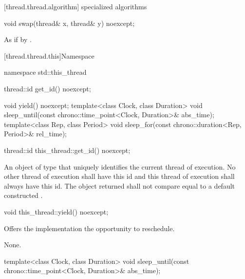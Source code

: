 [thread.thread.algorithm]{ specialized algorithms}

%
\begin{itemdecl}
void swap(thread& x, thread& y) noexcept;
\end{itemdecl}

\begin{itemdescr}
\pnum\effects As if by .
\end{itemdescr}

[thread.thread.this]{Namespace }

\begin{codeblock}
namespace std::this_thread {
  thread::id get_id() noexcept;

  void yield() noexcept;
  template<class Clock, class Duration>
    void sleep_until(const chrono::time_point<Clock, Duration>& abs_time);
  template<class Rep, class Period>
    void sleep_for(const chrono::duration<Rep, Period>& rel_time);
}
\end{codeblock}

%
\begin{itemdecl}
thread::id this_thread::get_id() noexcept;
\end{itemdecl}

\begin{itemdescr}
\pnum
\returns An object of type  that uniquely identifies the current thread of
execution. No other thread of execution shall have this id and this thread of execution shall
always have this id. The object returned shall not compare equal to a default constructed
.
\end{itemdescr}

%
\begin{itemdecl}
void this_thread::yield() noexcept;
\end{itemdecl}

\begin{itemdescr}
\pnum
\effects Offers the implementation the opportunity to reschedule.

\pnum
\sync None.
\end{itemdescr}

%
\begin{itemdecl}
template<class Clock, class Duration>
  void sleep_until(const chrono::time_point<Clock, Duration>& abs_time);
\end{itemdecl}

